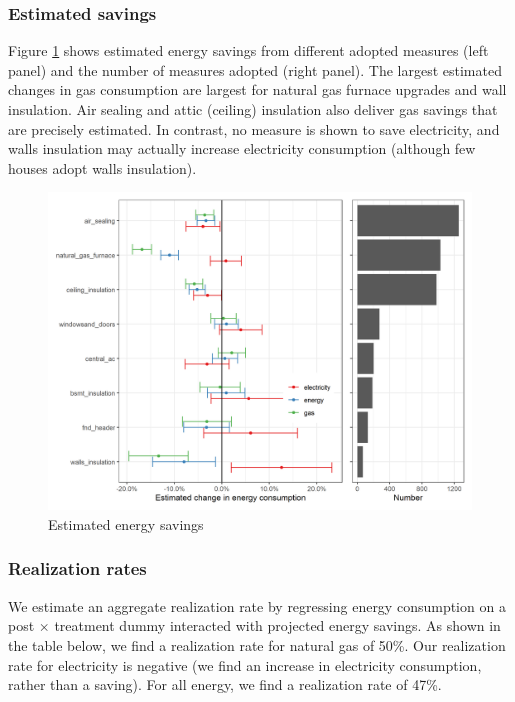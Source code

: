 \documentclass{article}
\begin{document}
\subsubsection{Estimated savings}

Figure \ref{fig_proj} shows estimated energy savings from different adopted measures (left panel) and the number of measures adopted (right panel). The largest estimated changes in gas consumption are largest for natural gas furnace upgrades and wall insulation. Air sealing and attic (ceiling) insulation also deliver gas savings that are precisely estimated. In contrast, no measure is shown to save electricity, and walls insulation may actually increase electricity consumption (although few houses adopt walls insulation).

\begin{figure}
	\includegraphics[width=\linewidth]{../output_figures_tables/mbm_energy_savings_combined.png}
	\caption{Estimated energy savings}\label{fig_proj}
\end{figure}


\subsubsection{Realization rates}
We estimate an aggregate realization rate by regressing energy consumption on a post $\times$ treatment dummy interacted with projected energy savings. As shown in the table below, we find a realization rate for natural gas of 50\%. Our realization rate for electricity is negative (we find an increase in electricity consumption, rather than a saving). For all energy, we find a realization rate of 47\%.
\end{document}
